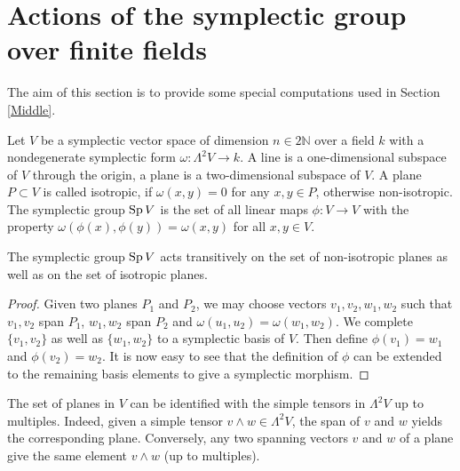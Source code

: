 \section{Actions of the symplectic group over finite fields}\label{Section_Symplectic}
The aim of this section is to provide some special computations used in Section \ref{Middle}.

Let $V$ be a symplectic vector space of dimension $n\in 2\mathbb{N}$ over a field $k$ with a nondegenerate symplectic form $\omega : \Lambda^2 V \rightarrow k$. A line is a one-dimensional subspace of $V$ through the origin, a plane is a two-dimensional subspace of $V$. A plane $P\subset V$ is called isotropic, if $\omega (x,y)=0$ for any $x,y\in P$, otherwise non-isotropic.  The symplectic group $\operatorname{Sp} V$ is the set of all linear maps $\phi : V\rightarrow V$ with the property $\omega(\phi(x),\phi(y)) = \omega(x,y)$ for all $ x,y\in V$.
\begin{proposition}\label{transitively}
The symplectic group $\operatorname{Sp} V$ acts transitively on the set of non-isotropic planes as well as on the set of isotropic planes.
\end{proposition}
\begin{proof}
Given two planes $P_1$ and $P_2$, we may choose vectors $v_1,v_2,w_1,w_2$ such that $v_1,v_2$ span $P_1$, $w_1,w_2$ span $P_2$ and $\omega(u_1,u_2) =\omega(w_1,w_2)$. We complete $\{v_1,v_2\}$ as well as $\{w_1,w_2\}$ to a symplectic basis of $V$.
Then define $\phi(v_1)=w_1$ and $\phi(v_2)=w_2$. 
It is now easy to see that the definition of $\phi$ can be extended to the remaining basis elements to give a symplectic morphism.
\end{proof}
\begin{remark} \label{simplePlanes}
The set of planes in $V$ can be identified with the simple tensors in $\Lambda^2V$ up to multiples. Indeed, given a simple tensor $v\wedge w \in \Lambda^2 V$, the span of $v$ and $w$ yields the corresponding plane. Conversely, any two spanning vectors $v$ and $w$ of a plane give the same element $v\wedge w$ (up to multiples).
\end{remark}
